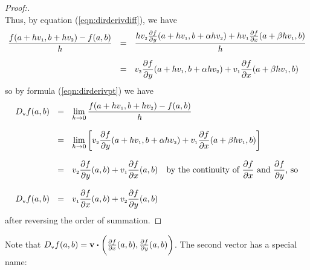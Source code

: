 \begin{proofbar}
\begin{proof}[Proof:]
\begin{displaymath}
 \end{displaymath}
 Thus, by equation (\ref{eqn:dirderivdiff}), we have
 \begin{align*}
  \frac{f(a+hv_{\scriptscriptstyle 1},b+hv_{\scriptscriptstyle 2}) - f(a,b)}{h} ~~ &= ~~
   \frac{hv_{\scriptscriptstyle 2}\tfrac{\partial f}{\partial y}(a+hv_{\scriptscriptstyle 1},b+\alpha hv_{\scriptscriptstyle 2}) +
    hv_{\scriptscriptstyle 1} \tfrac{\partial f}{\partial x}(a+\beta hv_{\scriptscriptstyle 1},b)}{h}\\[6pt]
   &= ~~ v_{\scriptscriptstyle 2}\frac{\partial f}{\partial y}(a+hv_{\scriptscriptstyle 1},b+\alpha hv_{\scriptscriptstyle 2}) +
    v_{\scriptscriptstyle 1} \frac{\partial f}{\partial x}(a+\beta hv_{\scriptscriptstyle 1},b)
 \end{align*}
 so by formula (\ref{eqn:dirderivpt}) we have
 \begin{align*}
  D_{\scriptscriptstyle \textbf{v}}f(a,b) ~~ &= ~~ \lim_{h \to 0} \dfrac{f(a+hv_{\scriptscriptstyle 1},b+hv_{\scriptscriptstyle 2}) - f(a,b)}{h}\\[8pt]
   &= ~~ \lim_{h \to 0} \left[ v_{\scriptscriptstyle 2}\frac{\partial f}{\partial y}(a+hv_{\scriptscriptstyle 1},b+\alpha hv_{\scriptscriptstyle 2}) +
    v_{\scriptscriptstyle 1} \frac{\partial f}{\partial x}(a+\beta hv_{\scriptscriptstyle 1},b) \right]\\[8pt]
   &= ~~ v_{\scriptscriptstyle 2}\frac{\partial f}{\partial y}(a,b) +
    v_{\scriptscriptstyle 1}\frac{\partial f}{\partial x}(a,b) \text{~~~by the continuity of $\frac{\partial f}{\partial x}$ and
     $\frac{\partial f}{\partial y}$, so}\\[8pt]
   D_{\scriptscriptstyle \textbf{v}}f(a,b) ~~ &= ~~ v_{\scriptscriptstyle 1}\frac{\partial f}{\partial x}(a,b) +
    v_{\scriptscriptstyle 2}\frac{\partial f}{\partial y}(a,b)
 \end{align*}
 after reversing the order of summation.\vspace{-3mm}
\end{proof}\end{proofbar}

Note that $D_{\scriptscriptstyle \textbf{v}}f(a,b) = \textbf{v} \bm{\cdot} \biggl(\frac{\partial f}{\partial x}(a,b),
\frac{\partial f}{\partial y}(a,b)\biggr)$. The second vector has a special name:


